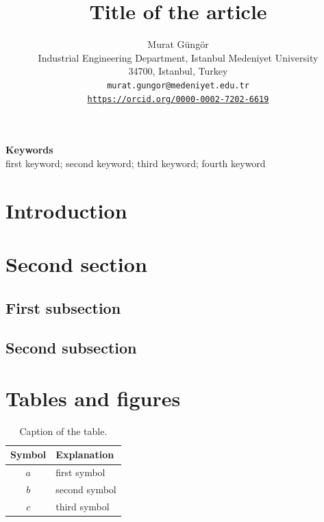 \documentclass[12 pt]{article}
\title{
Title of the article%
\bigskip
}
\author{
Murat Güngör \\
Industrial Engineering Department, Istanbul Medeniyet University \\
34700, Istanbul, Turkey \\
\textup{\texttt{murat.gungor@medeniyet.edu.tr}} \\
\textup{\texttt{\href{https://orcid.org/0000-0002-7202-6619}{https://orcid.org/0000-0002-7202-6619}}}
}
\date{} %
\begin{document}
\maketitle

\thispagestyle{empty} %


\begin{abstract}
\lipsum[1]
\end{abstract}

\begin{small}
\begin{center}
\textbf{Keywords} \\[4pt]
first keyword; second keyword; third keyword; fourth keyword
\end{center}
\end{small}

\section{Introduction}
\label{sec:intro}

\lipsum[2-3]

\section{Second section}
\label{sec:second}

\subsection{First subsection}
\label{subsec:first}

\lipsum[4]

\subsection{Second subsection}
\label{subsec:second}

\lipsum[5]

\section*{Tables and figures}

\lipsum[6]

\begingroup
\renewcommand{\arraystretch}{1.25}
\begin{table}[h]
\centering
\caption{Caption of the table.}
\label{tab:notation}
\begin{tabular}{c l}
\hline
Symbol & Explanation \\
\hline
$a$ & first symbol \\
$b$ & second symbol \\
$c$ & third symbol \\
\hline
\end{tabular}
\end{table}
\endgroup
\lipsum[7]
\end{document}
